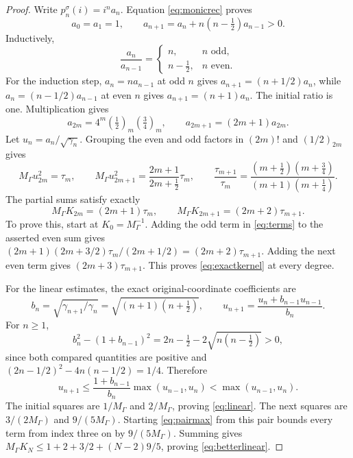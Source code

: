 \documentclass[11pt]{article}
\begin{document}
\begin{proof}
Write $p_n^\sigma(i)=i^na_n$.  Equation \eqref{eq:monicrec} proves
\[
 a_0=a_1=1,\qquad
 a_{n+1}=a_n+n(n-\tfrac12)a_{n-1}>0.
\]
Inductively,
\begin{equation}\label{eq:alternating}
 \frac{a_n}{a_{n-1}}=
 \begin{cases}n,&n\text{ odd},\\n-\tfrac12,&n\text{ even}.
 \end{cases}
\end{equation}
For the induction step, $a_n=na_{n-1}$ at odd $n$ gives
$a_{n+1}=(n+1/2)a_n$, while $a_n=(n-1/2)a_{n-1}$ at even $n$
gives $a_{n+1}=(n+1)a_n$.  The initial ratio is one.  Multiplication gives
\[
 a_{2m}=4^m(\tfrac12)_m(\tfrac34)_m,
 \qquad a_{2m+1}=(2m+1)a_{2m}.
\]
Let $u_n=a_n/\sqrt{\gamma_n}$.  Grouping the even and odd factors
in $(2m)!$ and $(1/2)_{2m}$ gives
\begin{equation}\label{eq:terms}
 M_\Gamma u_{2m}^2=\tau_m,\qquad
 M_\Gamma u_{2m+1}^2=\frac{2m+1}{2m+\tfrac12}\tau_m,
 \qquad
 \frac{\tau_{m+1}}{\tau_m}
 =\frac{(m+\tfrac12)(m+\tfrac34)}{(m+1)(m+\tfrac14)}.
\end{equation}
The partial sums satisfy exactly
\[
 M_\Gamma K_{2m}=(2m+1)\tau_m,
 \qquad M_\Gamma K_{2m+1}=(2m+2)\tau_{m+1}.
\]
To prove this, start at $K_0=M_\Gamma^{-1}$.  Adding the odd term
in \eqref{eq:terms} to the asserted even sum gives
$(2m+1)(2m+3/2)\tau_m/(2m+1/2)=(2m+2)\tau_{m+1}$.
Adding the next even term gives $(2m+3)\tau_{m+1}$.  This proves
\eqref{eq:exactkernel} at every degree.

For the linear estimates, the exact original-coordinate coefficients are
\[
 b_n=\sqrt{\gamma_{n+1}/\gamma_n}=\sqrt{(n+1)(n+\tfrac12)},
 \qquad u_{n+1}=\frac{u_n+b_{n-1}u_{n-1}}{b_n}.
\]
For $n\ge1$,
\[
 b_n^2-(1+b_{n-1})^2
 =2n-\tfrac12-2\sqrt{n(n-\tfrac12)}>0,
\]
since both compared quantities are positive and
$(2n-1/2)^2-4n(n-1/2)=1/4$.  Therefore
\begin{equation}\label{eq:pairmax}
 u_{n+1}\le\frac{1+b_{n-1}}{b_n}\max(u_{n-1},u_n)
 <\max(u_{n-1},u_n).
\end{equation}
The initial squares are $1/M_\Gamma$ and $2/M_\Gamma$, proving
\eqref{eq:linear}.  The next squares are $3/(2M_\Gamma)$ and
$9/(5M_\Gamma)$.  Starting \eqref{eq:pairmax} from this pair bounds
every term from index three on by $9/(5M_\Gamma)$.  Summing gives
$M_\Gamma K_N\le1+2+3/2+(N-2)9/5$, proving
\eqref{eq:betterlinear}.
\end{proof}
\end{document}
